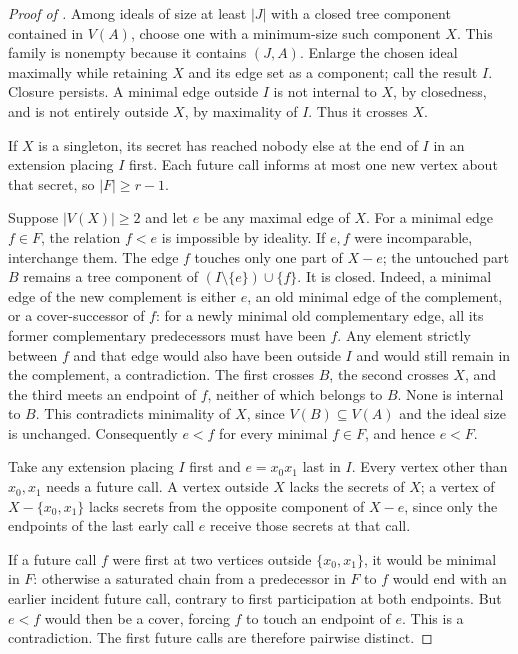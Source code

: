 \documentclass[USenglish, a4paper, thm-restate,numberwithinsect, cleveref]{lipics-v2021}
\begin{document}
\begin{proof}[Proof of ]
Among ideals of size at least $|J|$ with a closed tree component
contained in $V(A)$, choose one with a minimum-size such component
$X$. This family is nonempty because it contains $(J,A)$. Enlarge
the chosen ideal maximally while retaining $X$ and its edge set as
a component; call the result $I$. Closure persists. A minimal edge
outside $I$ is not internal to $X$, by closedness, and is not
entirely outside $X$, by maximality of $I$. Thus it crosses $X$.

If $X$ is a singleton, its secret has reached nobody else at the end
of $I$ in an extension placing $I$ first. Each future call informs
at most one new vertex about that secret, so $|F|\ge r-1$.

Suppose $|V(X)|\ge2$ and let $e$ be any maximal edge of $X$.
For a minimal edge $f\in F$, the relation $f<e$ is impossible by
ideality. If $e,f$ were incomparable, interchange them. The edge
$f$ touches only one part of $X-e$; the untouched part $B$ remains
a tree component of $(I\setminus\{e\})\cup\{f\}$. It is closed. Indeed, a minimal edge
of the new complement is either $e$, an old minimal edge of the complement,
or a cover-successor of $f$: for a newly minimal old complementary
edge, all its former complementary predecessors must have been $f$.
Any element strictly between $f$ and that edge would also have been
outside $I$ and would still remain in the complement, a contradiction.
The first crosses $B$, the second
crosses $X$, and the third meets an endpoint of $f$, neither of
which belongs to $B$. None is internal to $B$. This contradicts
minimality of $X$, since $V(B)\subseteq V(A)$ and the ideal size
is unchanged. Consequently $e<f$ for every minimal $f\in F$, and
hence $e<F$.

Take any extension placing $I$ first and $e=x_0x_1$ last in $I$.
Every vertex other than $x_0,x_1$ needs a future call. A vertex outside $X$ lacks the
secrets of $X$; a vertex of $X-\{x_0,x_1\}$ lacks secrets from
the opposite component of $X-e$, since only the endpoints of the
last early call $e$ receive those secrets at that call.

If a future call $f$ were first at two vertices outside $\{x_0,x_1\}$,
it would be minimal
in $F$: otherwise a saturated chain from a predecessor in $F$ to
$f$ would end with an earlier incident future call, contrary to
first participation at both endpoints. But $e<f$ would then be a
cover, forcing $f$ to touch an endpoint of $e$. This is a
contradiction. The first future calls are therefore pairwise distinct.
\end{proof}
\end{document}
